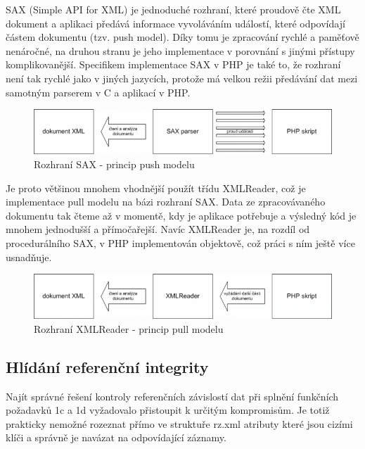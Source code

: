 \documentclass[11pt,twoside,a4paper]{book}
\begin{document}
SAX (Simple API for XML) je jednoduché rozhraní, které proudově čte XML dokument a aplikaci předává informace vyvoláváním událostí, které odpovídají částem dokumentu (tzv. push model). Díky tomu je zpracování rychlé a paměťově nenáročné, na druhou stranu je jeho implementace v porovnání s jinými přístupy komplikovanější. Specifikem implementace SAX v PHP je také to, že rozhraní není tak rychlé jako v jiných jazycích, protože má velkou režii předávání dat mezi samotným parserem v C a aplikací v PHP. 

\begin{figure}[h]
\begin{center}
\includegraphics[width=12cm]{figures/sax.png}
\caption{Rozhraní SAX - princip push modelu}
\label{fig:sax}
\end{center}
\end{figure}

Je proto většinou mnohem vhodnější použít třídu XMLReader, což je implementace pull modelu na bázi rozhraní SAX. Data ze zpracovávaného dokumentu tak čteme až v momentě, kdy je aplikace potřebuje a výsledný kód je mnohem jednodušší a přímočařejší. Navíc XMLReader je, na rozdíl od procedurálního SAX, v PHP implementován objektově, což práci s ním ještě více usnadňuje.

\begin{figure}[h]
\begin{center}
\includegraphics[width=12cm]{figures/xmlreader.png}
\caption{Rozhraní XMLReader - princip pull modelu}
\label{fig:xmlreader}
\end{center}
\end{figure}


\subsection{Hlídání referenční integrity}

Najít správné řešení kontroly referenčních závislostí dat při splnění funkčních požadavků 1c a 1d vyžadovalo přistoupit k určitým kompromisům. Je totiž prakticky nemožné rozeznat přímo ve struktuře rz.xml atributy které jsou cizími klíči a správně je navázat na odpovídající záznamy. 
\end{document}
